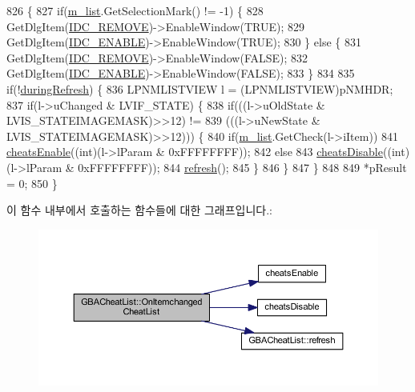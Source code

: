 \begin{DoxyCode}
826 \{
827   \textcolor{keywordflow}{if}(\mbox{\hyperlink{class_g_b_a_cheat_list_a00626f69b0783f81eaf76a4483ea76ed}{m\_list}}.GetSelectionMark() != -1) \{
828     GetDlgItem(\mbox{\hyperlink{resource_8h_aa8441a495432bef29886eed49bbaa08c}{IDC\_REMOVE}})->EnableWindow(TRUE);
829     GetDlgItem(\mbox{\hyperlink{resource_8h_a093c54af5e55f25a680ada00f278ac80}{IDC\_ENABLE}})->EnableWindow(TRUE);
830   \} \textcolor{keywordflow}{else} \{
831     GetDlgItem(\mbox{\hyperlink{resource_8h_aa8441a495432bef29886eed49bbaa08c}{IDC\_REMOVE}})->EnableWindow(FALSE);
832     GetDlgItem(\mbox{\hyperlink{resource_8h_a093c54af5e55f25a680ada00f278ac80}{IDC\_ENABLE}})->EnableWindow(FALSE);
833   \}
834   
835   \textcolor{keywordflow}{if}(!\mbox{\hyperlink{class_g_b_a_cheat_list_a799afe054e40958158b51a8d79b20b56}{duringRefresh}}) \{
836     LPNMLISTVIEW l = (LPNMLISTVIEW)pNMHDR;
837     \textcolor{keywordflow}{if}(l->uChanged & LVIF\_STATE) \{
838       \textcolor{keywordflow}{if}(((l->uOldState & LVIS\_STATEIMAGEMASK)>>12) !=
839          (((l->uNewState & LVIS\_STATEIMAGEMASK)>>12))) \{
840         \textcolor{keywordflow}{if}(\mbox{\hyperlink{class_g_b_a_cheat_list_a00626f69b0783f81eaf76a4483ea76ed}{m\_list}}.GetCheck(l->iItem))
841           \mbox{\hyperlink{_cheats_8cpp_afb0a033fa261826873aa428ff61bad33}{cheatsEnable}}((\textcolor{keywordtype}{int})(l->lParam & 0xFFFFFFFF));
842         \textcolor{keywordflow}{else}
843           \mbox{\hyperlink{_cheats_8cpp_a1615f3e49a019904e52ee98348fe918d}{cheatsDisable}}((\textcolor{keywordtype}{int})(l->lParam & 0xFFFFFFFF));
844         \mbox{\hyperlink{class_g_b_a_cheat_list_a12928bb674926ae02d5a3ceb156a3b53}{refresh}}();
845       \}
846     \}
847   \}
848   
849   *pResult = 0;
850 \}
\end{DoxyCode}
이 함수 내부에서 호출하는 함수들에 대한 그래프입니다.\+:
\nopagebreak
\begin{figure}[H]
\begin{center}
\leavevmode
\includegraphics[width=350pt]{class_g_b_a_cheat_list_a64182036127e2c73d0c79706cc1f2d1e_cgraph}
\end{center}
\end{figure}
\mbox{\label{class_g_b_a_cheat_list_a32b955a45061f6e2fbeb513341b90bff}} 

